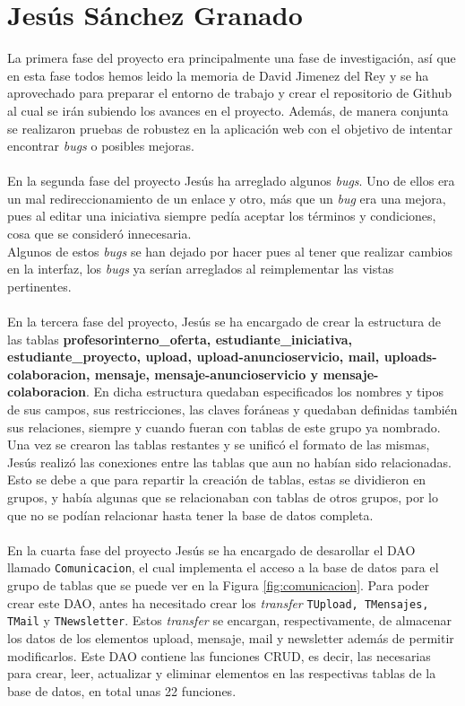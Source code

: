 \documentclass[11pt]{book}
\begin{document}
	\section{Jesús Sánchez Granado}
La primera fase del proyecto era principalmente una fase de investigación, así que en esta fase todos hemos leido la memoria de David Jimenez del Rey y se ha aprovechado para preparar el entorno de trabajo y crear el repositorio de Github al cual se irán subiendo los avances en el proyecto. Además, de manera conjunta se realizaron pruebas de robustez en la aplicación web con el objetivo de intentar encontrar \emph{bugs} o posibles mejoras.\\\\
En la segunda fase del proyecto Jesús ha arreglado algunos \emph{bugs}. Uno de ellos era un mal redireccionamiento de un enlace y otro, más que un \emph{bug} era una mejora, pues al editar una iniciativa siempre pedía aceptar los términos y condiciones, cosa que se consideró innecesaria.\\
Algunos de estos \emph{bugs} se han dejado por hacer pues al tener que realizar cambios en la interfaz, los \emph{bugs} ya serían arreglados al reimplementar las vistas pertinentes.\\\\
En la tercera fase del proyecto, Jesús se ha encargado de crear la estructura de las tablas \textbf{profesorinterno\_oferta, estudiante\_iniciativa, estudiante\_proyecto, upload, upload-anuncioservicio, mail, uploads-colaboracion, mensaje, mensaje-anuncioservicio y mensaje-colaboracion}. En dicha estructura quedaban especificados los nombres y tipos de sus campos, sus restricciones, las claves foráneas y quedaban definidas también sus relaciones, siempre y cuando fueran con tablas de este grupo ya nombrado.\\
Una vez se crearon las tablas restantes y se unificó el formato de las mismas, Jesús realizó las conexiones entre las tablas que aun no habían sido relacionadas. Esto se debe a que para repartir la creación de tablas, estas se dividieron en grupos, y había algunas que se relacionaban con tablas de otros grupos, por lo que no se podían relacionar hasta tener la base de datos completa.\\\\
En la cuarta fase del proyecto Jesús se ha encargado de desarollar el DAO llamado \texttt{Comunicacion}, el cual implementa el acceso a la base de datos para el grupo de tablas que se puede ver en la Figura \ref{fig:comunicacion}. Para poder crear este DAO, antes ha necesitado crear los \emph{transfer} \texttt{TUpload, TMensajes, TMail} y \texttt{TNewsletter}. Estos \emph{transfer} se encargan, respectivamente, de almacenar los datos de los elementos upload, mensaje, mail y newsletter además de permitir modificarlos. Este DAO contiene las funciones CRUD, es decir, las necesarias para crear, leer, actualizar y eliminar elementos en las respectivas tablas de la base de datos, en total unas 22 funciones. \\
\end{document}
